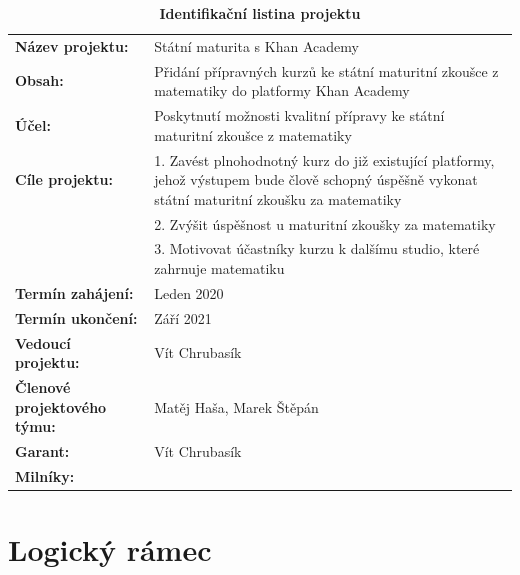 \documentclass[12pt, a4paper]{report}
\begin{document}
\begin{table}[htbp]
\caption{\textbf{Identifikační listina projektu}}
\centering
\footnotesize
\begin{tabularx}{\textwidth}{lX}
\textbf{Název projektu:} & Státní maturita s Khan Academy\\
\textbf{Obsah:} & Přidání přípravných kurzů ke státní maturitní zkoušce z matematiky do platformy Khan Academy\\
\textbf{Účel:} & Poskytnutí možnosti kvalitní přípravy ke státní maturitní zkoušce z matematiky\\
\textbf{Cíle projektu:} & 1. Zavést plnohodnotný kurz do již existující platformy, jehož výstupem bude člově schopný úspěšně vykonat státní maturitní zkoušku za matematiky\\
 & 2. Zvýšit úspěšnost u maturitní zkoušky za matematiky\\
 & 3. Motivovat účastníky kurzu k dalšímu studio, které zahrnuje matematiku\\
\textbf{Termín zahájení:} & Leden 2020\\
\textbf{Termín ukončení:} & Září 2021\\
\textbf{Vedoucí projektu:} & Vít Chrubasík\\
\textbf{Členové projektového týmu:} & Matěj Haša, Marek Štěpán\\
\textbf{Garant:} & Vít Chrubasík\\
\textbf{Milníky:} & \\
\end{tabularx}
\end{table}


\chapter{Logický rámec}
\label{sec:org801389c}
\end{document}
